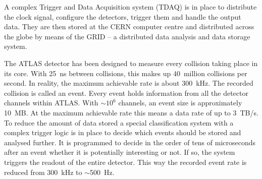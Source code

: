 A complex Trigger and Data Acquisition system (TDAQ) is in place to distribute the clock signal, configure the detectors, trigger them and handle the output data. They are then stored at the CERN computer centre and distributed across the globe by means of the GRID -- a distributed data analysis and data storage system.

The ATLAS detector has been designed to measure every collision taking place in its core. With 25~ns between collisions, this makes up 40~million collisions per second. In reality, the maximum achievable rate is about 300~kHz. The recorded collision is called an event. Every event holds information from all the detector channels within ATLAS. With $\sim$$10^6$ channels, an event size is approximately 10~MB. At the maximum achievable rate this means a data rate of up to 3~TB/s. To reduce the amount of data stored a special classification system with a complex trigger logic is in place to decide which events should be stored and analysed further. It is programmed to decide in the order of tens of microseconds after an event whether it is potentially interesting or not. If so, the system triggers the readout of the entire detector. This way the recorded event rate is reduced from 300~kHz to $\sim$500~Hz.



